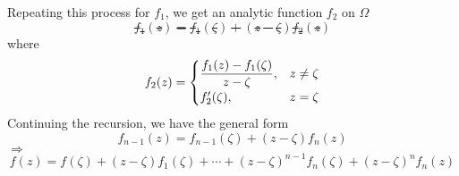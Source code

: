 Repeating this process for  $ f_1 $, we get an analytic function  $ f_2 $ on  $ \Omega $ \st 
\begin{equation}
    f_1(z)=f_1(\zeta)+(z-\zeta)f_2(z)
\end{equation} 
where 
\begin{equation}
    f_2(z)=\begin{cases}
        \displaystyle\frac{f_1(z)-f_1(\zeta)}{z-\zeta},&z\not=\zeta\\
        f_2'(\zeta),&z=\zeta
    \end{cases}
\end{equation}
Continuing the recursion, we have the general form 
\begin{equation}
    f_{n-1}(z)=f_{n-1}(\zeta)+(z-\zeta)f_n(z)
\end{equation}
 $ \Rightarrow $ 
\begin{equation}
    f(z)=f(\zeta)+(z-\zeta)f_1(\zeta)+\cdots+(z-\zeta)^{n-1}f_n(\zeta)+(z-\zeta)^nf_n(z)
\end{equation}  
